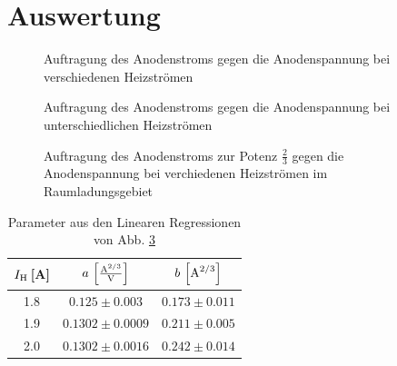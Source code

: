 \documentclass[12pt,a4paper,titlepage,headinclude,bibtotoc]{scrartcl}
\begin{document}
\section{Auswertung}
\label{sec:auswertung}
\begin{figure}[h]
  \centering
  \hfill
  \hfill
  \caption{Auftragung des Anodenstroms gegen die Anodenspannung bei verschiedenen Heizströmen}
  \label{fig:heiz}
\end{figure}



\begin{figure}[!h]
	\centering
	
	\caption{Auftragung des Anodenstroms gegen die Anodenspannung bei unterschiedlichen Heizströmen}
	\label{fig:h}
\end{figure}


\begin{figure}[h]
   \centering
   \hfill
   \hfill
   \caption{Auftragung des Anodenstroms zur Potenz $\frac{2}{3}$ gegen die Anodenspannung bei verchiedenen Heizströmen im Raumladungsgebiet}
   \label{fig:raumladung}
 \end{figure}

\begin{table}[!h]
\centering
\begin{tabular}{|c|c|c|}
\hline
$I_\text H\,$[A]& $a\,\left[\frac{\text A^{2/3}}{\text V}\right]$	& $b\,\left[\text A^{2/3}\right]$			\\\hline\hline
1.8 		& $0.125\pm 0.003$	& $0.173\pm 0.011$	\\\hline
1.9 		& $0.1302\pm0.0009$ 	& $0.211\pm 0.005$	\\\hline
2.0 		& $0.1302\pm 0.0016$	& $0.242 \pm 0.014$	\\\hline
\end{tabular}
\caption{Parameter aus den Linearen Regressionen von Abb. \ref{fig:raumladung}}
\label{tab:ParaRaum}
\end{table}
\end{document}

